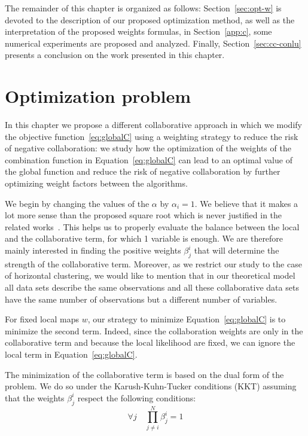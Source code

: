 The remainder of this chapter is organized as follows: Section~\ref{sec:opt-w} is devoted to the description of our proposed optimization method, as well as the interpretation of the proposed weights formulas, in Section~\ref{app:c}, some numerical experiments are proposed and analyzed. Finally, Section~\ref{sec:cc-conlu} presents a conclusion on the work presented in this chapter.

\label{sec:opt-w}

\section{Optimization problem}

In this chapter we  propose a different collaborative approach in which we modify the objective function~\eqref{eq:globalC} using a weighting  strategy to reduce the risk of negative collaboration: we study how the optimization of the weights of the combination function in Equation~\eqref{eq:globalC} can lead to an optimal value of the global function and reduce the risk of negative collaboration by further optimizing weight factors between the algorithms.

We begin by changing the values of the $\alpha$ by $\alpha_i=1$. We believe that it makes a lot more sense than the proposed square root which is never justified in the related works~\cite{grozavu2010topological,grozavu2011learning}. This helps us to properly evaluate the balance between the local and the collaborative term, for which 1 variable is enough.
We are therefore mainly interested in finding the positive weights $\beta_j^i$ that will determine the strength of the collaborative term. 
Moreover, as we restrict our study to the case of horizontal clustering, we would like to mention that in our theoretical model all data sets describe the same observations and all these collaborative data sets have the same number of observations but a different number of variables.  


For fixed local maps $w$, our strategy to minimize Equation~\eqref{eq:globalC} is to minimize the second term. Indeed, since the collaboration weights are only in the collaborative term and because the local likelihood are fixed, we can ignore the local term in Equation~\eqref{eq:globalC}.

The minimization of the collaborative term is based on the dual form of the problem. We do so under the Karush-Kuhn-Tucker conditions (KKT) 
\cite{KKT1} assuming that the weights $\beta_j^i$ respect the following conditions:
$$\forall j \quad \prod_{j \neq i}^N \beta_j^i = 1$$ 

